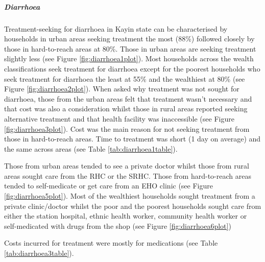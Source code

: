 \documentclass[12pt,a4paper]{article}
\let\oldsubparagraph\subparagraph
\renewcommand{\subparagraph}[1]{\oldsubparagraph{#1}\mbox{}}
\begin{document}
\hypertarget{diarrhoea}{%
\subparagraph{Diarrhoea}\label{diarrhoea}}

Treatment-seeking for diarrhoea in Kayin state can be characterised by households in urban areas seeking treatment the most (88\%) followed closely by those in hard-to-reach areas at 80\%. Those in urban areas are seeking treatment slightly less (see Figure \ref{fig:diarrhoea1plot}). Most households across the wealth classifications seek treatment for diarrhoea except for the poorest households who seek treatment for diarrhoea the least at 55\% and the wealthiest at 80\% (see Figure \ref{fig:diarrhoea2plot}). When asked why treatment was not sought for diarrhoea, those from the urban areas felt that treatment wasn't necessary and that cost was also a consideration whilst those in rural areas reported seeking alternative treatment and that health facility was inaccessible (see Figure \ref{fig:diarrhoea3plot}). Cost was the main reason for not seeking treatment from those in hard-to-reach areas. Time to treatment was short (1 day on average) and the same across areas (see Table \ref{tab:diarrhoea1table}).

Those from urban areas tended to see a private doctor whilst those from rural areas sought care from the RHC or the SRHC. Those from hard-to-reach areas tended to self-medicate or get care from an EHO clinic (see Figure \ref{fig:diarrhoea5plot}). Most of the wealthiest households sought treatment from a private clinic/doctor whilst the poor and the poorest households sought care from either the station hospital, ethnic health worker, community health worker or self-medicated with drugs from the shop (see Figure \ref{fig:diarrhoea6plot})

Costs incurred for treatment were mostly for medications (see Table \ref{tab:diarrhoea3table}).
\end{document}
